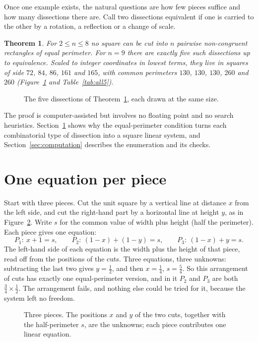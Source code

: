 \documentclass[11pt]{article}
\newtheorem{theorem}{Theorem}
\begin{document}
Once one example exists, the natural questions are how few pieces suffice and how many dissections there are. Call two dissections equivalent if one is carried to the other by a rotation, a reflection or a change of scale.

\begin{theorem}\label{thm:main}
For $2\le n\le 8$ no square can be cut into $n$ pairwise non-congruent rectangles of equal perimeter. For $n=9$ there are exactly five such dissections up to equivalence. Scaled to integer coordinates in lowest terms, they live in squares of side $72$, $84$, $86$, $161$ and $165$, with common perimeters $130$, $130$, $130$, $260$ and $260$ (Figure~\ref{fig:all5} and Table~\ref{tab:all5}).
\end{theorem}

\begin{figure}[ht]
\centering

\caption{The five dissections of Theorem~\ref{thm:main}, each drawn at the same size.}
\label{fig:all5}
\end{figure}

The proof is computer-assisted but involves no floating point and no search heuristics. Section~\ref{sec:mechanism} shows why the equal-perimeter condition turns each combinatorial type of dissection into a square linear system, and Section~\ref{sec:computation} describes the enumeration and its checks.

\section{One equation per piece}\label{sec:mechanism}

Start with three pieces. Cut the unit square by a vertical line at distance $x$ from the left side, and cut the right-hand part by a horizontal line at height $y$, as in Figure~\ref{fig:mech}. Write $s$ for the common value of width plus height (half the perimeter). Each piece gives one equation:
\[
P_1:\ x+1=s,\qquad P_2:\ (1-x)+(1-y)=s,\qquad P_3:\ (1-x)+y=s .
\]
The left-hand side of each equation is the width plus the height of that piece, read off from the positions of the cuts. Three equations, three unknowns: subtracting the last two gives $y=\tfrac12$, and then $x=\tfrac14$, $s=\tfrac54$. So this arrangement of cuts has exactly one equal-perimeter version, and in it $P_2$ and $P_3$ are both $\tfrac34\times\tfrac12$. The arrangement fails, and nothing else could be tried for it, because the system left no freedom.

\begin{figure}[ht]
\centering

\caption{Three pieces. The positions $x$ and $y$ of the two cuts, together with the half-perimeter $s$, are the unknowns; each piece contributes one linear equation.}
\label{fig:mech}
\end{figure}
\end{document}
